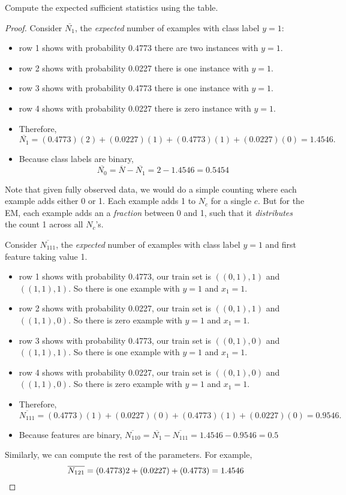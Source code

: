 \documentclass{discussion}
\begin{document}
\begin{exercise}
	Compute the expected sufficient statistics using the table.
\end{exercise}
\begin{proof}
 Consider $\overline{N_1}$, the \emph{expected} number of examples with class label $y = 1$:%
\begin{itemize}
		\item row 1 shows with probability 0.4773 there are two instances with $y = 1$. 
		\item row 2 shows with probability 0.0227 there is one instance with $y = 1$.
		\item row 3 shows with probability 0.4773 there is one instance with $y = 1$.
		\item row 4 shows with probability 0.0227 there is zero instance with $y = 1$.
		\item Therefore, \[\overline{N_1} = (0.4773)(2) + (0.0227)(1) + (0.4773)(1) + (0.0227)(0) = 1.4546.\]
		\item Because class labels are binary, \[\overline{N_0} = \overline{N} - \overline{N_1} = 2 - 1.4546 = 0.5454\]
\end{itemize}

 Note that given fully observed data, we would do a simple counting where each example adds either 0 or 1. Each example adds 1 to $N_c$ for a single $c$. But for the EM, each example adds an a \emph{fraction} between 0 and 1, such that it \emph{distributes} the count 1 across all $N_c$'s.

 Consider $\overline{N_{111}}$, the \emph{expected} number of examples with class label $y=1$ and first feature taking value 1.
\begin{itemize}
		\item row 1 shows with probability 0.4773, our train set is $((0,1), 1)$ and $((1,1), 1)$. So there is one example with $y=1$ and $x_1 = 1$.
		\item row 2 shows with probability 0.0227, our train set is $((0,1), 1)$ and $((1,1), 0)$. So there is zero example with $y=1$ and $x_1 = 1$.
		\item row 3 shows with probability 0.4773, our train set is $((0,1), 0)$ and $((1,1), 1)$. So there is one example with $y=1$ and $x_1 = 1$. 
		\item row 4 shows with probability 0.0227, our train set is $((0,1), 0)$ and $((1,1), 0)$. So there is zero example with $y=1$ and $x_1 = 1$.
		\item Therefore, \[\overline{N_{111}} = (0.4773)(1) + (0.0227)(0)+ (0.4773)(1) + (0.0227)(0) = 0.9546.\]
		\item Because features are binary, $\overline{N_{110}} = \overline{N_{1}} - \overline{N_{111}} = 1.4546 - 0.9546 = 0.5$
\end{itemize}
Similarly, we can compute the rest of the parameters. For example,
\[\overline{N_{121}} = (0.4773)2 + (0.0227) + (0.4773) = 1.4546 \qedhere\]
\end{proof}
\end{document}
